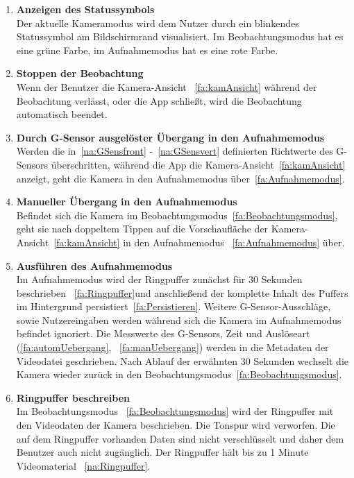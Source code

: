 \begin{enumerate}
\item \label{fa:Statussymbol}\textbf{Anzeigen des Statussymbols} \hfill \\
Der aktuelle Kameramodus wird dem Nutzer durch ein blinkendes Statussymbol am Bildschirmrand visualisiert. Im Beobachtungsmodus hat es eine grüne Farbe, im Aufnahmemodus hat es eine rote Farbe.

\item \textbf{Stoppen der Beobachtung} \hfill \\
Wenn der Benutzer die Kamera-Ansicht ~\eqref{fa:kamAnsicht} während der Beobachtung verlässt, oder die \gls{App} schließt, wird die Beobachtung automatisch beendet.

\item \label{fa:automUebergang}\textbf{Durch \gls{G-Sensor} ausgelöster Übergang in den Aufnahmemodus} \hfill \\
Werden die in~\eqref{na:GSensfront} -~\eqref{na:GSensvert} definierten Richtwerte des G-Sensors überschritten, während die \gls{App} die Kamera-Ansicht~\eqref{fa:kamAnsicht} anzeigt, geht die Kamera in den Aufnahmemodus über~\eqref{fa:Aufnahmemodus}. 

\item \label{fa:manUebergang}\textbf{Manueller Übergang in den Aufnahmemodus} \hfill \\
Befindet sich die Kamera im Beobachtungsmodus~\eqref{fa:Beobachtungsmodus}, geht sie nach doppeltem Tippen auf die Vorschaufläche der Kamera-Ansicht~\eqref{fa:kamAnsicht} in den Aufnahmemodus ~\eqref{fa:Aufnahmemodus} über.

\item \label{fa:Aufnahmemodus}\textbf{Ausführen des Aufnahmemodus} \hfill \\
Im Aufnahmemodus wird der \gls{Ringpuffer} zunächst für 30 Sekunden beschrieben ~\eqref{fa:Ringpuffer}und anschließend der komplette Inhalt des Puffers im Hintergrund persistiert~\eqref{fa:Persistieren}. Weitere \gls{G-Sensor}-Ausschläge, sowie Nutzereingaben werden während sich die Kamera im Aufnahmemodus befindet ignoriert. Die Messwerte des G-Sensors, Zeit und Auslöseart (\eqref{fa:automUebergang}, ~\eqref{fa:manUebergang}) werden in die \gls{Metadaten} der Videodatei geschrieben. Nach Ablauf der erwähnten 30 Sekunden wechselt die Kamera wieder zurück in den Beobachtungsmodus~\eqref{fa:Beobachtungsmodus}.

\item \label{fa:Ringpuffer}\textbf{\gls{Ringpuffer} beschreiben} \hfill \\
Im Beobachtungsmodus ~\eqref{fa:Beobachtungsmodus} wird der \gls{Ringpuffer} mit den Videodaten der Kamera beschrieben. Die Tonspur wird verworfen. Die auf dem Ringpuffer vorhanden Daten sind nicht verschlüsselt und daher dem Benutzer auch nicht zugänglich. Der Ringpuffer hält bis zu 1 Minute Videomaterial ~\eqref{na:Ringpuffer}.


\end{enumerate}
